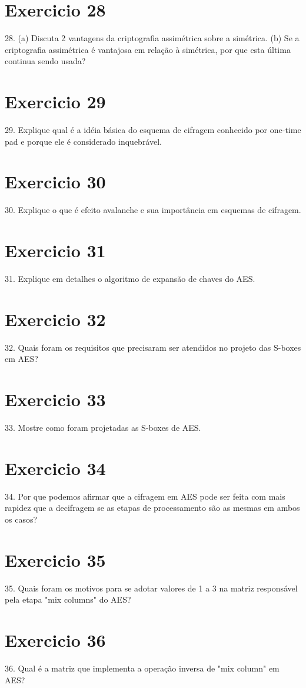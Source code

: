 \documentclass[10pt,a4paper]{article}
\begin{document}
\section*{Exercicio 28}
28. (a) Discuta 2 vantagens da criptografia assimétrica sobre a simétrica.
(b) Se a criptografia assimétrica é vantajosa em relação à simétrica, por que esta última continua sendo usada?
\section*{Exercicio 29}
29. Explique qual é a idéia básica do esquema de cifragem conhecido por one-time pad e porque ele é considerado inquebrável.
\section*{Exercicio 30}
30. Explique o que é efeito avalanche e sua importância em esquemas de cifragem.
\section*{Exercicio 31}
31. Explique em detalhes o algoritmo de expansão de chaves do AES.
\section*{Exercicio 32}
32. Quais foram os requisitos que precisaram ser atendidos no projeto das S-boxes em AES?
\section*{Exercicio 33}
33. Mostre como foram projetadas as S-boxes de AES.
\section*{Exercicio 34}
34. Por que podemos afirmar que a cifragem em AES pode ser feita com mais rapidez que a decifragem se as etapas de processamento são as mesmas em ambos os casos?
\section*{Exercicio 35}
35. Quais foram os motivos para se adotar valores de 1 a 3 na matriz responsável pela etapa "mix columns" do AES?
\section*{Exercicio 36}
36. Qual é a matriz que implementa a operação inversa de "mix column" em AES?
\end{document}

